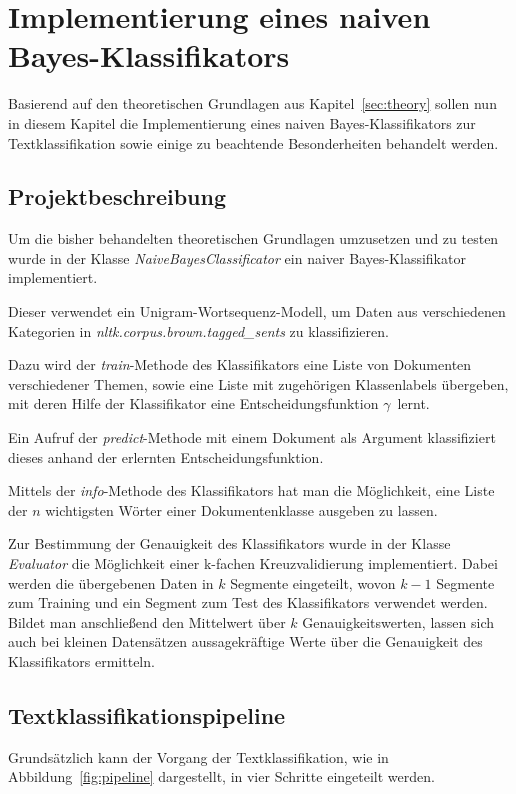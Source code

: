 \section{Implementierung eines naiven Bayes-Klassifikators}
    Basierend auf den theoretischen Grundlagen aus Kapitel~\ref{sec:theory} sollen nun in diesem Kapitel die Implementierung eines naiven Bayes-Klassifikators zur Textklassifikation sowie einige zu beachtende Besonderheiten behandelt werden.

    \subsection{Projektbeschreibung}
        Um die bisher behandelten theoretischen Grundlagen umzusetzen und zu testen wurde in der Klasse \textit{NaiveBayesClassificator} ein naiver Bayes-Klassifikator implementiert.

        Dieser verwendet ein Unigram-Wortsequenz-Modell, um Daten aus verschiedenen Kategorien in \textit{nltk.corpus.brown.tagged\_sents} zu klassifizieren.

        Dazu wird der \textit{train}-Methode des Klassifikators eine Liste von Dokumenten verschiedener Themen, sowie eine Liste mit zugehörigen Klassenlabels übergeben, mit deren Hilfe der Klassifikator eine Entscheidungsfunktion $\gamma$~lernt.

        Ein Aufruf der \textit{predict}-Methode mit einem Dokument als Argument klassifiziert dieses anhand der erlernten Entscheidungsfunktion.

        Mittels der \textit{info}-Methode des Klassifikators hat man die Möglichkeit, eine Liste der $n$ wichtigsten Wörter einer Dokumentenklasse ausgeben zu lassen.
        \newline
        
        Zur Bestimmung der Genauigkeit des Klassifikators wurde in der Klasse \textit{Evaluator} die Möglichkeit einer k-fachen Kreuzvalidierung implementiert.
        Dabei werden die übergebenen Daten in $k$ Segmente eingeteilt, wovon $k-1$ Segmente zum Training und ein Segment zum Test des Klassifikators verwendet werden.
        Bildet man anschließend den Mittelwert über $k$ Genauigkeitswerten, lassen sich auch bei kleinen Datensätzen aussagekräftige Werte über die Genauigkeit des Klassifikators ermitteln.

    \subsection{Textklassifikationspipeline}
        Grundsätzlich kann der Vorgang der Textklassifikation, wie in Abbildung~\ref{fig:pipeline} dargestellt, in vier Schritte eingeteilt werden.

